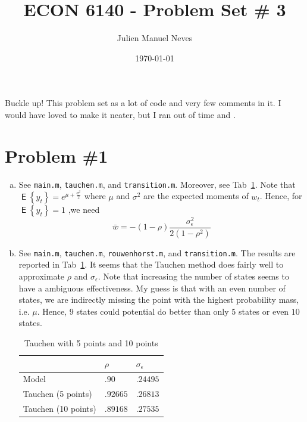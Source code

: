 \documentclass[12pt]{article}
\title{ECON 6140 - Problem Set \# 3}
\date{\today}
\author{Julien Manuel Neves}
\newcommand{\1}{{\bf 1}} %
\DeclareMathOperator{\E}{\mathsf{E}} %
\newcommand{\Ex}[1]{\E\left\{#1\right\}} %
\begin{document}
\maketitle

Buckle up! This problem set as a lot of code and very few comments in it.  I would have loved to make it neater, but I ran out of time and .

\section*{Problem \#1}


\begin{enumerate}[(a)]
\item


See \texttt{main.m}, \texttt{tauchen.m}, and \texttt{transition.m}. Moreover, see Tab~\ref{tab:tab1}. Note that $\Ex{y_t}=e^{\mu+\frac{\sigma^2}{2}}$ where $\mu$ and $\sigma^2$ are the expected moments of $w_t$. Hence, for $\Ex{y_t}=1$ ,we need
\[
\bar{w}=-(1-\rho)\frac{\sigma_\epsilon^2}{2(1-\rho^2)}
\]


\item

See \texttt{main.m}, \texttt{tauchen.m}, \texttt{rouwenhorst.m}, and \texttt{transition.m}. The results are reported in Tab~\ref{tab:tab1}. It seems that the Tauchen method does fairly well to approximate $\rho$ and $\sigma_\epsilon$. Note that increasing the number of states seems to have a ambiguous effectiveness. My guess is that with an even number of states, we are indirectly missing the point with the highest probability mass, i.e. $\mu$. Hence, $9$ states could potential do better than only $5$ states or even $10$ states.

\begin{table}[H]
	\centering
	\label{tab:tab1}
	\begin{tabular}{@{}lll@{}}
		\toprule
		& $\rho$   & $\sigma_{\epsilon}$ \\ \midrule
		Model               & $.90$     & $.24495$            \\
		Tauchen (5 points)  & $.92665$ & $.26813$            \\
		Tauchen (10 points) & $.89168$ & $.27535$            \\ \bottomrule
	\end{tabular}
	\caption{Tauchen with 5 points and 10 points}
\end{table}


\end{enumerate}
\end{document}
